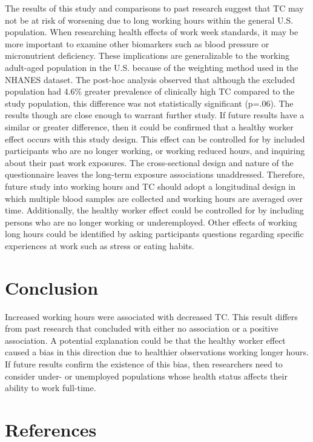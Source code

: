 \documentclass[]{elsarticle} %
\begin{document}
The results of this study and comparisons to past research suggest that
TC may not be at risk of worsening due to long working hours within the
general U.S. population. When researching health effects of work week
standards, it may be more important to examine other biomarkers such as
blood pressure or micronutrient deficiency. These implications are
generalizable to the working adult-aged population in the U.S. because
of the weighting method used in the NHANES dataset. The post-hoc
analysis observed that although the excluded population had 4.6\%
greater prevalence of clinically high TC compared to the study
population, this difference was not statistically significant (p=.06).
The results though are close enough to warrant further study. If future
results have a similar or greater difference, then it could be confirmed
that a healthy worker effect occurs with this study design. This effect
can be controlled for by included participants who are no longer
working, or working reduced hours, and inquiring about their past work
exposures. The cross-sectional design and nature of the questionnaire
leaves the long-term exposure associations unaddressed. Therefore,
future study into working hours and TC should adopt a longitudinal
design in which multiple blood samples are collected and working hours
are averaged over time. Additionally, the healthy worker effect could be
controlled for by including persons who are no longer working or
underemployed. Other effects of working long hours could be identified
by asking participants questions regarding specific experiences at work
such as stress or eating habits.

\hypertarget{conclusion}{%
\section{Conclusion}\label{conclusion}}

Increased working hours were associated with decreased TC. This result
differs from past research that concluded with either no association or
a positive association. A potential explanation could be that the
healthy worker effect caused a bias in this direction due to healthier
observations working longer hours. If future results confirm the
existence of this bias, then researchers need to consider under- or
unemployed populations whose health status affects their ability to work
full-time.

\hypertarget{references}{%
\section*{References}\label{references}}
\end{document}
